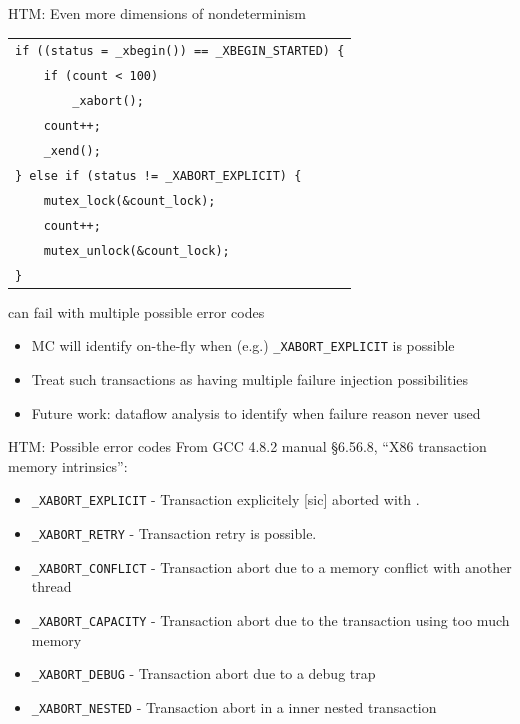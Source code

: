 \documentclass[xcolor=dvipsnames]{beamer}
\begin{document}
\begin{frame}{HTM: Even more dimensions of nondeterminism}
	\begin{center}
		\begin{tabular}{l}
			\texttt{if ((status = \_xbegin()) == \_XBEGIN\_STARTED) \{} \\
			\texttt{~~~~if (count < 100)}\\
			\texttt{~~~~~~~~\_xabort();} \\
			\texttt{~~~~count++;} \\
			\texttt{~~~~\_xend();} \\
			\texttt{\} else if (status != \_XABORT\_EXPLICIT) \{} \\
			\texttt{~~~~mutex\_lock(\&count\_lock);} \\
			\texttt{~~~~count++;} \\
			\texttt{~~~~mutex\_unlock(\&count\_lock);} \\
			\texttt{\}} \\
		\end{tabular}
	\end{center}
	\linegap

	\xbegin can fail with multiple possible error codes
	\begin{itemize}
		\item MC will identify on-the-fly when (e.g.) {\tt \_XABORT\_EXPLICIT} is possible
		\item Treat such transactions as having multiple failure injection possibilities
		\item Future work: dataflow analysis to identify when failure reason never used
	\end{itemize}
\end{frame}

\begin{frame}{HTM: Possible \xabort error codes}
	From GCC 4.8.2 manual \S 6.56.8, ``X86 transaction memory intrinsics'':
	\begin{itemize}
		\item {\tt \_XABORT\_EXPLICIT} - Transaction explicitely [sic] aborted with \xabort.
		\item {\tt \_XABORT\_RETRY} - Transaction retry is possible.
		\item {\tt \_XABORT\_CONFLICT} - Transaction abort due to a memory conflict with another thread
		\item {\tt \_XABORT\_CAPACITY} - Transaction abort due to the transaction using too much memory
		\item {\tt \_XABORT\_DEBUG} - Transaction abort due to a debug trap
		\item {\tt \_XABORT\_NESTED} - Transaction abort in a inner nested transaction 
	\end{itemize}
\end{frame}
\end{document}
